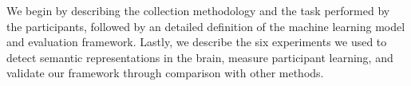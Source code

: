 \label{chapter:methodologies}

We begin by describing the collection methodology and the task performed by the participants, followed by an detailed definition of the machine learning model and evaluation framework. Lastly, we describe the six experiments we used to detect semantic representations in the brain, measure participant learning, and validate our framework through comparison with other methods.




